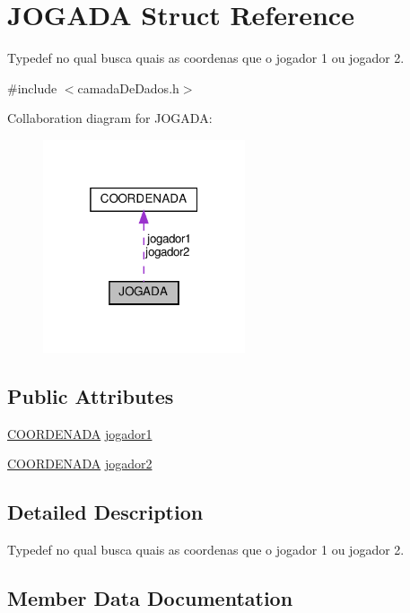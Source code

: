 \hypertarget{structJOGADA}{}\section{J\+O\+G\+A\+DA Struct Reference}
\label{structJOGADA}


Typedef no qual busca quais as coordenas que o jogador 1 ou jogador 2.  




{\ttfamily \#include $<$camada\+De\+Dados.\+h$>$}



Collaboration diagram for J\+O\+G\+A\+DA\+:\nopagebreak
\begin{figure}[H]
\begin{center}
\leavevmode
\includegraphics[width=169pt]{structJOGADA__coll__graph}
\end{center}
\end{figure}
\subsection*{Public Attributes}
\begin{DoxyCompactItemize}
\item 
\hyperlink{structCOORDENADA}{C\+O\+O\+R\+D\+E\+N\+A\+DA} \hyperlink{structJOGADA_a93d9306cb0c49b66b7d9a615bffe0149}{jogador1}
\item 
\hyperlink{structCOORDENADA}{C\+O\+O\+R\+D\+E\+N\+A\+DA} \hyperlink{structJOGADA_ab46b16dfbdc7f2af9430c8dcdac0914b}{jogador2}
\end{DoxyCompactItemize}


\subsection{Detailed Description}
Typedef no qual busca quais as coordenas que o jogador 1 ou jogador 2. 

\subsection{Member Data Documentation}
\mbox{\label{structJOGADA_a93d9306cb0c49b66b7d9a615bffe0149}} 
